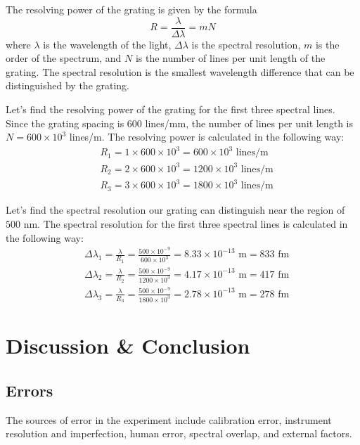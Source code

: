\documentclass[10pt]{article}
\begin{document}
The resolving power of the grating is given by the formula
\begin{equation}
  R = \frac{\lambda}{\Delta \lambda} = mN
  \label{eq:2}
\end{equation}
where $\lambda$ is the wavelength of the light, $\Delta \lambda$ is the spectral resolution, $m$ is the order of the spectrum, and $N$ is the number of lines per unit length of the grating. The spectral resolution is the smallest wavelength difference that can be distinguished by the grating. 

Let's find the resolving power of the grating for the first three spectral lines. Since the grating spacing is $600$ lines/mm, the number of lines per unit length is $N = 600 \times 10^3$ lines/m. The resolving power is calculated in the following way:
\begin{align}
  &R_1 = 1 \times 600 \times 10^3 = 600 \times 10^3 \text{ lines/m} \\
  &R_2 = 2 \times 600 \times 10^3 = 1200 \times 10^3 \text{ lines/m} \\
  &R_3 = 3 \times 600 \times 10^3 = 1800 \times 10^3 \text{ lines/m}
\end{align}

Let's find the spectral resolution our grating can distinguish near the region of $500$ nm. The spectral resolution for the first three spectral lines is calculated in the following way:
\begin{align}
  &\Delta \lambda_1 = \frac{\lambda}{R_1} = \frac{500 \times 10^{-9}}{600 \times 10^3} = 8.33 \times 10^{-13} \text{ m} = 833 \text{ fm} \\
  &\Delta \lambda_2 = \frac{\lambda}{R_2} = \frac{500 \times 10^{-9}}{1200 \times 10^3} = 4.17 \times 10^{-13} \text{ m} = 417 \text{ fm} \\
  &\Delta \lambda_3 = \frac{\lambda}{R_3} = \frac{500 \times 10^{-9}}{1800 \times 10^3} = 2.78 \times 10^{-13} \text{ m} = 278 \text{ fm}
\end{align}

\section{Discussion \& Conclusion}

\subsection*{Errors}

The sources of error in the experiment include calibration error, instrument resolution and imperfection, human error, spectral overlap, and external factors.
\end{document}

